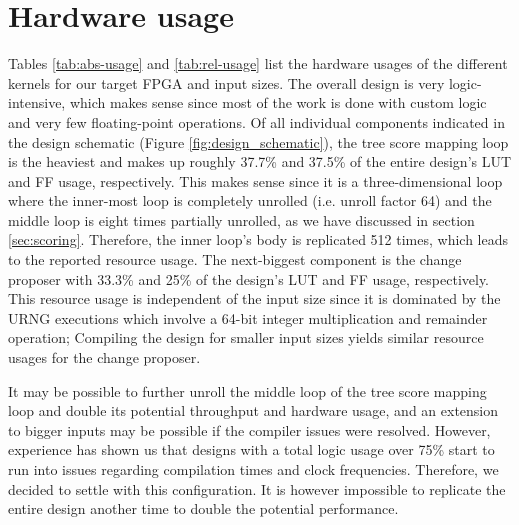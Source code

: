 \section{Hardware usage}

Tables \ref{tab:abs-usage} and \ref{tab:rel-usage} list the hardware usages of the different kernels for our target \ac{FPGA} and input sizes. The overall design is very logic-intensive, which makes sense since most of the work is done with custom logic and very few floating-point operations. Of all individual components indicated in the design schematic (Figure \ref{fig:design_schematic}), the tree score mapping loop is the heaviest and makes up roughly 37.7\% and 37.5\% of the entire design's \ac{LUT} and \ac{FF} usage, respectively. This makes sense since it is a three-dimensional loop where the inner-most loop is completely unrolled (i.e. unroll factor 64) and the middle loop is eight times partially unrolled, as we have discussed in section \ref{sec:scoring}. Therefore, the inner loop's body is replicated 512 times, which leads to the reported resource usage. The next-biggest component is the change proposer with 33.3\% and 25\% of the design's \ac{LUT} and \ac{FF} usage, respectively. This resource usage is independent of the input size since it is dominated by the \ac{URNG} executions which involve a 64-bit integer multiplication and remainder operation; Compiling the design for smaller input sizes yields similar resource usages for the change proposer.

It may be possible to further unroll the middle loop of the tree score mapping loop and double its potential throughput and hardware usage, and an extension to bigger inputs may be possible if the compiler issues were resolved. However, experience has shown us that designs with a total logic usage over 75\% start to run into issues regarding compilation times and clock frequencies. Therefore, we decided to settle with this configuration. It is however impossible to replicate the entire design another time to double the potential performance.

